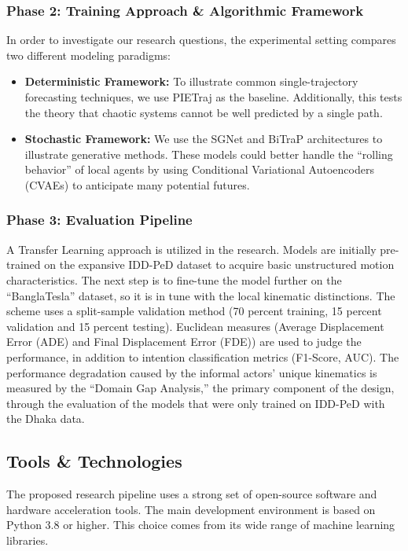\documentclass[12pt, a4paper]{article}
\begin{document}
\subsubsection{Phase 2: Training Approach \& Algorithmic Framework}
In order to investigate our research questions, the experimental setting compares two different modeling paradigms:
\begin{itemize}
    \item \textbf{Deterministic Framework:} To illustrate common single-trajectory forecasting techniques, we use PIETraj \cite{rasouli2019pie} as the baseline. Additionally, this tests the theory that chaotic systems cannot be well predicted by a single path.
    \item \textbf{Stochastic Framework:} We use the SGNet \cite{wang2022stepwise} and BiTraP \cite{yao2021bitrap} architectures to illustrate generative methods. These models could better handle the ``rolling behavior'' of local agents by using Conditional Variational Autoencoders (CVAEs) to anticipate many potential futures.
\end{itemize}

\subsubsection{Phase 3: Evaluation Pipeline}
A Transfer Learning approach is utilized in the research. Models are initially pre-trained on the expansive IDD-PeD dataset \cite{bokkasam2025pedestrian} to acquire basic unstructured motion characteristics. The next step is to fine-tune the model further on the ``BanglaTesla'' dataset, so it is in tune with the local kinematic distinctions. The scheme uses a split-sample validation method (70 percent training, 15 percent validation and 15 percent testing). Euclidean measures (Average Displacement Error (ADE) and Final Displacement Error (FDE)) are used to judge the performance, in addition to intention classification metrics (F1-Score, AUC). The performance degradation caused by the informal actors' unique kinematics is measured by the ``Domain Gap Analysis,'' the primary component of the design, through the evaluation of the models that were only trained on IDD-PeD with the Dhaka data.

\subsection{Tools \& Technologies}
The proposed research pipeline uses a strong set of open-source software and hardware acceleration tools. The main development environment is based on Python 3.8 or higher. This choice comes from its wide range of machine learning libraries.
\end{document}
